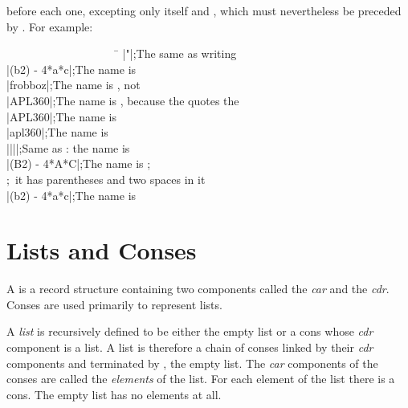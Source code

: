{before each one, excepting only
\cd{|} itself and \cd{{\Xbackslash}}, which must nevertheless be preceded by \cd{{\Xbackslash}}.
For example:
\begin{lisp}
~~~~~~~~~~~~~~~~~~~~\=\kill
|"|\>;{\rm The same as writing } \\
|(b{\Xcircumflex}2) - 4*a*c|\>;{\rm The name is } \\
|frobboz|\>;{\rm The name is , not } \\
|APL{\Xbackslash}360|\>;{\rm The name is , because the \cd{{\Xbackslash}} quotes the } \\
|APL{\Xbackslash}{\Xbackslash}360|\>;{\rm The name is } \\
|apl{\Xbackslash}{\Xbackslash}360|\>;{\rm The name is } \\
|{\Xbackslash}|{\Xbackslash}||\>;{\rm Same as \cd{{\Xbackslash}|{\Xbackslash}|}: the name is \cd{||}} \\
|(B{\Xcircumflex}2) - 4*A*C|\>;{\rm The name is ;} \\
\>;~{\rm it has parentheses and two spaces in it} \\
|(b{\Xcircumflex}2) - 4*a*c|\>;{\rm The name is }
\end{lisp}


\section{Lists and Conses}

A  is a record structure containing two components
called the {\it car} and the {\it cdr}.  Conses are used primarily
to represent lists.

A {\it list} is recursively defined to be either the empty list
or a cons whose {\it cdr} component is a list.
A list is therefore a chain of conses linked by their {\it cdr} components
and terminated by {\nil}, the empty list.  The {\it car} components of the conses
are called the {\it elements} of the list.  For each element of the list
there is a cons.  The empty list has no elements at all.

}
